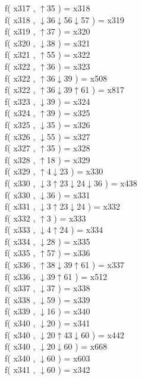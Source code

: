 f( x317 , $\uparrow$35 ) = x318 \\
f( x318 , $\downarrow$36$\downarrow$56$\downarrow$57 ) = x319 \\
f( x319 , $\uparrow$37 ) = x320 \\
f( x320 , $\downarrow$38 ) = x321 \\
f( x321 , $\uparrow$55 ) = x322 \\
f( x322 , $\uparrow$36 ) = x323 \\
f( x322 , $\uparrow$36$\downarrow$39 ) = x508 \\
f( x322 , $\uparrow$36$\downarrow$39$\uparrow$61 ) = x817 \\
f( x323 , $\downarrow$39 ) = x324 \\
f( x324 , $\uparrow$39 ) = x325 \\
f( x325 , $\downarrow$35 ) = x326 \\
f( x326 , $\downarrow$55 ) = x327 \\
f( x327 , $\uparrow$35 ) = x328 \\
f( x328 , $\uparrow$18 ) = x329 \\
f( x329 , $\uparrow$4$\downarrow$23 ) = x330 \\
f( x330 , $\downarrow$3$\uparrow$23$\downarrow$24$\downarrow$36 ) = x438 \\
f( x330 , $\downarrow$36 ) = x331 \\
f( x331 , $\downarrow$3$\uparrow$23$\downarrow$24 ) = x332 \\
f( x332 , $\uparrow$3 ) = x333 \\
f( x333 , $\downarrow$4$\uparrow$24 ) = x334 \\
f( x334 , $\downarrow$28 ) = x335 \\
f( x335 , $\uparrow$57 ) = x336 \\
f( x336 , $\uparrow$38$\downarrow$39$\uparrow$61 ) = x337 \\
f( x336 , $\downarrow$39$\uparrow$61 ) = x512 \\
f( x337 , $\downarrow$37 ) = x338 \\
f( x338 , $\downarrow$59 ) = x339 \\
f( x339 , $\downarrow$16 ) = x340 \\
f( x340 , $\downarrow$20 ) = x341 \\
f( x340 , $\downarrow$20$\uparrow$43$\downarrow$60 ) = x442 \\
f( x340 , $\downarrow$20$\downarrow$60 ) = x668 \\
f( x340 , $\downarrow$60 ) = x603 \\
f( x341 , $\downarrow$60 ) = x342 \\
